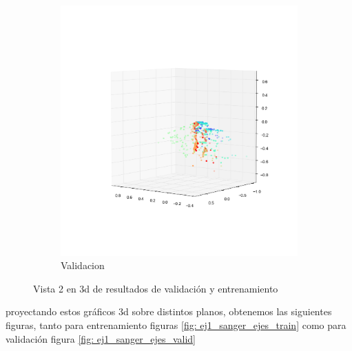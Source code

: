 \begin{figure}[H]
\begin{subfigure}[b]{0.5\textwidth}
                \includegraphics[width=\linewidth]{secciones/graficos/sanger/2_train.png}
                \caption{Validacion}
                \label{fig: ej1_sanger_3d_2_valid}
        \end{subfigure}
        \caption{Vista 2 en 3d de resultados de validación y entrenamiento}
        \label{fig: ej1_sanger_3d_2}
\end{figure}

\par proyectando estos gráficos 3d sobre distintos planos, obtenemos las siguientes figuras, tanto para entrenamiento figuras \ref{fig: ej1_sanger_ejes_train} como para validación figura \ref{fig: ej1_sanger_ejes_valid}


